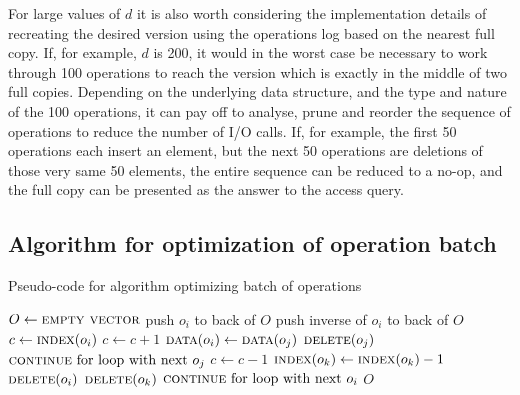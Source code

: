 For large values of $d$ it is also worth considering the implementation details
of recreating the desired version using the operations log based on the
nearest full copy. If, for example, $d$ is 200, it would in the worst case be
necessary to work through 100 operations to reach the version which is exactly
in the middle of two full copies. Depending on the underlying data structure,
and the type and nature of the 100 operations, it can pay off to analyse,
prune and reorder the sequence of operations to reduce the number of I/O calls.
If, for example, the first 50 operations each insert an element, but the next 50
operations are deletions of those very same 50 elements, the entire sequence can
be reduced to a no-op, and the full copy can be presented as the answer to the
access query.

\subsection{Algorithm for optimization of operation batch}
\begin{algorithm}
  \caption{Pseudo-code for algorithm optimizing batch of operations}
  \begin{algorithmic}[1]
      \State $O \gets \textsc{empty vector}$
          \State push $o_i$ to back of $O$
        \Else
          \State push inverse of $o_i$ to back of $O$
        \EndIf
      \EndFor
          \State $c \gets \textsc{index}(o_i)$
              \State $c \gets c+1$
              \State $\textsc{data}(o_i) \gets \textsc{data}(o_j)$
              \State $\textsc{delete}(o_j)$
              \State $\textsc{continue}\textnormal{ for loop with next }o_j$
                \State $c \gets c-1$
                  \State $\textsc{index}(o_k) \gets \textsc{index}(o_k) - 1$
                \EndFor
                \State $\textsc{delete}(o_i)$
                \State $\textsc{delete}(o_k)$
                \State $\textsc{continue}\textnormal{ for loop with next }o_i$
              \EndIf
            \EndIf
          \EndFor
        \EndIf
      \EndFor
      \State \Return $O$
    \EndFunction
  \end{algorithmic}
\end{algorithm}

